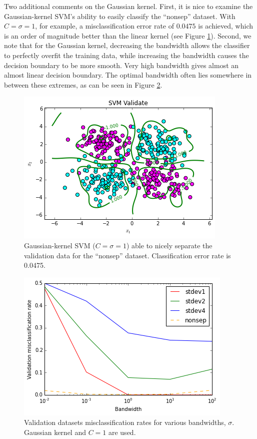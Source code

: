 \documentclass[10pt]{article}
\begin{document}
Two additional comments on the Gaussian kernel.  First, it is nice to examine the Gaussian-kernel SVM's ability to easily classify the ``nonsep'' dataset.  With $C=\sigma=1$, for example, a misclassification error rate of $0.0475$ is achieved, which is an order of magnitude better than the linear kernel (see Figure \ref{nonsep_gaussian}).  Second, we note that for the Gaussian kernel, decreasing the bandwidth allows the classifier to perfectly overfit the training data, while increasing the bandwidth causes the decision boundary to be more smooth.  Very high bandwidth gives almost an almost linear decision boundary. The optimal bandwidth often lies somewhere in between these extremes, as can be seen in Figure \ref{bandwidth_cer}.
\begin{figure}
\centering
\includegraphics[scale=0.5]{nonsep_gaussian.png}
\caption{Gaussian-kernel SVM ($C=\sigma=1$) able to nicely separate the validation data for the ``nonsep'' dataset.  Classification error rate is 0.0475.}
\label{nonsep_gaussian}
\end{figure}
\begin{figure}
\centering
\includegraphics[scale=0.5]{bandwidth_cer.png}
\caption{Validation datasets misclassification rates for various bandwidths, $\sigma$.  Gaussian kernel and $C=1$ are used.}
\label{bandwidth_cer}
\end{figure}
\end{document}
